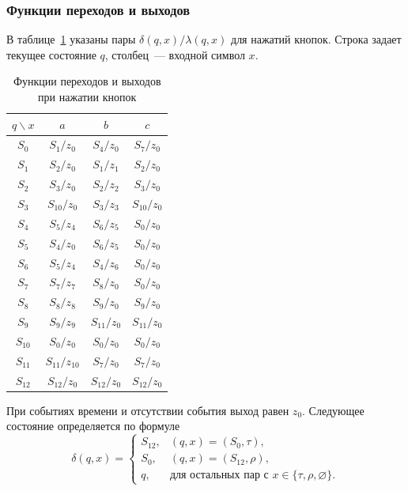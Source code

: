 \newpage
\subsubsection{Функции переходов и выходов}
\label{sec:functions}

В таблице~\ref{tab:functions} указаны пары $\delta(q,x)/\lambda(q,x)$ для нажатий кнопок. Строка задает текущее состояние $q$, столбец~--- входной символ $x$.

\begin{table}[H]
	\centering
	\caption{Функции переходов и выходов при нажатии кнопок}
	\label{tab:functions}
	\small{}
	\renewcommand{\arraystretch}{1.1}
	\setlength{\tabcolsep}{9pt}
	\begin{tabular}{|c|ccc|}
		\hline
		$q \backslash x$ & $a$ & $b$ & $c$ \\
		\hline
		$S_{0}$ & $S_{1}/z_{0}$ & $S_{4}/z_{0}$ & $S_{7}/z_{0}$ \\
		$S_{1}$ & $S_{2}/z_{0}$ & $S_{1}/z_{1}$ & $S_{2}/z_{0}$ \\
		$S_{2}$ & $S_{3}/z_{0}$ & $S_{2}/z_{2}$ & $S_{3}/z_{0}$ \\
		$S_{3}$ & $S_{10}/z_{0}$ & $S_{3}/z_{3}$ & $S_{10}/z_{0}$ \\
		$S_{4}$ & $S_{5}/z_{4}$ & $S_{6}/z_{5}$ & $S_{0}/z_{0}$ \\
		$S_{5}$ & $S_{4}/z_{0}$ & $S_{6}/z_{5}$ & $S_{0}/z_{0}$ \\
		$S_{6}$ & $S_{5}/z_{4}$ & $S_{4}/z_{6}$ & $S_{0}/z_{0}$ \\
		$S_{7}$ & $S_{7}/z_{7}$ & $S_{8}/z_{0}$ & $S_{0}/z_{0}$ \\
		$S_{8}$ & $S_{8}/z_{8}$ & $S_{9}/z_{0}$ & $S_{9}/z_{0}$ \\
		$S_{9}$ & $S_{9}/z_{9}$ & $S_{11}/z_{0}$ & $S_{11}/z_{0}$ \\
		$S_{10}$ & $S_{0}/z_{0}$ & $S_{0}/z_{0}$ & $S_{0}/z_{0}$ \\
		$S_{11}$ & $S_{11}/z_{10}$ & $S_{7}/z_{0}$ & $S_{7}/z_{0}$ \\
		$S_{12}$ & $S_{12}/z_{0}$ & $S_{12}/z_{0}$ & $S_{12}/z_{0}$ \\
		\hline
	\end{tabular}
\end{table}

При событиях времени и отсутствии события выход равен $z_0$. Следующее состояние определяется по формуле
\[
	\delta(q,x)=
	\begin{cases}
		S_{12}, & (q,x)=(S_0,\tau),\\
		S_0,    & (q,x)=(S_{12},\rho),\\
		q,      & \text{для остальных пар с } x\in\{\tau,\rho,\varnothing\}.
	\end{cases}
\]

